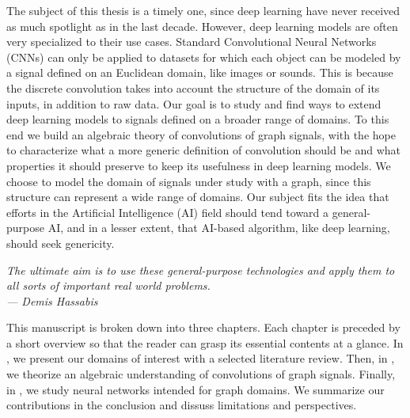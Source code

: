 The subject of this thesis is a timely one, since deep learning have never received as much spotlight as in the last decade. However, deep learning models are often very specialized to their use cases. Standard Convolutional Neural Networks (CNNs) can only be applied to datasets for which each object can be modeled by a signal defined on an Euclidean domain, like images or sounds. This is because the discrete convolution takes into account the structure of the domain of its inputs, in addition to raw data. Our goal is to study and find ways to extend deep learning models to signals defined on a broader range of domains. To this end we build an algebraic theory of convolutions of graph signals, with the hope to characterize what a more generic definition of convolution should be and what properties it should preserve to keep its usefulness in deep learning models. We choose to model the domain of signals under study with a graph, since this structure can represent a wide range of domains. Our subject fits the idea that efforts in the Artificial Intelligence (AI) field should tend toward a general-purpose AI, and in a lesser extent, that AI-based algorithm, like deep learning, should seek genericity.

\begin{displayquote}
\begin{flushright}
\emph{The ultimate aim is to use these general-purpose technologies and apply them to all sorts of important real world problems.\\
--- Demis Hassabis}
\end{flushright}
\end{displayquote}

This manuscript is broken down into three chapters. Each chapter is preceded by a short overview so that the reader can grasp its essential contents at a glance. In , we present our domains of interest with a selected literature review. Then, in , we theorize an algebraic understanding of convolutions of graph signals. Finally, in , we study neural networks intended for graph domains. We summarize our contributions in the conclusion and dissuss limitations and perspectives.



